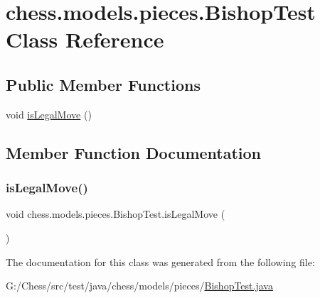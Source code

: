 \hypertarget{classchess_1_1models_1_1pieces_1_1_bishop_test}{}\section{chess.\+models.\+pieces.\+Bishop\+Test Class Reference}
\label{classchess_1_1models_1_1pieces_1_1_bishop_test}
\subsection*{Public Member Functions}
\begin{DoxyCompactItemize}
\item 
void \mbox{\hyperlink{classchess_1_1models_1_1pieces_1_1_bishop_test_a8da72169eb2ccd336e5a7a1535c246ac}{is\+Legal\+Move}} ()
\end{DoxyCompactItemize}


\subsection{Member Function Documentation}
\mbox{\label{classchess_1_1models_1_1pieces_1_1_bishop_test_a8da72169eb2ccd336e5a7a1535c246ac}} 
\subsubsection{\texorpdfstring{is\+Legal\+Move()}{isLegalMove()}}
{\footnotesize\ttfamily void chess.\+models.\+pieces.\+Bishop\+Test.\+is\+Legal\+Move (\begin{DoxyParamCaption}{ }\end{DoxyParamCaption})}



The documentation for this class was generated from the following file\+:\begin{DoxyCompactItemize}
\item 
G\+:/\+Chess/src/test/java/chess/models/pieces/\mbox{\hyperlink{_bishop_test_8java}{Bishop\+Test.\+java}}\end{DoxyCompactItemize}

